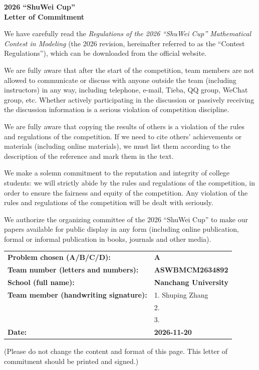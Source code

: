 \documentclass[12pt]{article}
\begin{document}
\begin{center}
{\Large\bfseries 2026 ``ShuWei Cup''}\\[4pt]
{\Large\bfseries Letter of Commitment}
\end{center}

\vspace{1.2em}

We have carefully read the \emph{Regulations of the 2026 ``ShuWei Cup'' Mathematical Contest in Modeling} (the 2026 revision, hereinafter referred to as the ``Contest Regulations''), which can be downloaded from the official website.

We are fully aware that after the start of the competition, team members are not allowed to communicate or discuss with anyone outside the team (including instructors) in any way, including telephone, e-mail, Tieba, QQ group, WeChat group, etc. Whether actively participating in the discussion or passively receiving the discussion information is a serious violation of competition discipline.

We are fully aware that copying the results of others is a violation of the rules and regulations of the competition. If we need to cite others' achievements or materials (including online materials), we must list them according to the description of the reference and mark them in the text.

We make a solemn commitment to the reputation and integrity of college students: we will strictly abide by the rules and regulations of the competition, in order to ensure the fairness and equity of the competition. Any violation of the rules and regulations of the competition will be dealt with seriously.

We authorize the organizing committee of the 2026 ``ShuWei Cup'' to make our papers available for public display in any form (including online publication, formal or informal publication in books, journals and other media).

\vspace{1.5em}

\begin{tabular}{@{}p{7.2cm}p{8.2cm}@{}}
\textbf{Problem chosen (A/B/C/D):} & \textbf{A} \\[10pt]
\textbf{Team number (letters and numbers):} & \textbf{ASWBMCM2634892} \\[10pt]
\textbf{School (full name):} & \textbf{Nanchang University} \\[10pt]
\textbf{Team member (handwriting signature):} & 1. Shuping Zhang \\[10pt]
 & 2. \\[10pt]
 & 3. \\[14pt]
\textbf{Date:} & \textbf{2026-11-20} \\
\end{tabular}

\vfill
\begin{center}
\small (Please do not change the content and format of this page. This letter of commitment should be printed and signed.)
\end{center}
\end{document}
